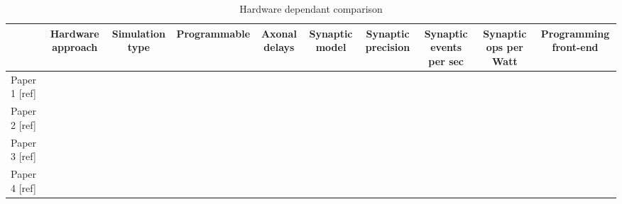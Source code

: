 \begin{table*}
  \caption{Hardware dependant comparison}
  \begin{center}
      \bgroup
      \def\arraystretch{1.4}
    \begin{tabular}{l | c c c c c c c c c}
      $ $ & 
       \begin{minipage}{1.2cm}\centering Hardware approach \end{minipage} & 
       \begin{minipage}{1.3cm}\centering Simulation type \end{minipage} & 
       \begin{minipage}{1.7cm}\centering Programmable \end{minipage} & 
       \begin{minipage}{1cm}\centering Axonal delays \end{minipage} & 
       \begin{minipage}{1cm}\centering Synaptic model \end{minipage} & 
       \begin{minipage}{1.2cm}\centering Synaptic precision \end{minipage} & 
       \begin{minipage}{1.2cm}\centering Synaptic events per sec \end{minipage} & 
       \begin{minipage}{1.4cm}\centering Synaptic ops per Watt \end{minipage} & 
       \begin{minipage}{1.7cm}\centering Programming front-end \end{minipage}  \\
       \hline
       \begin{minipage}{1.8cm}\centering Paper 1 [ref] \end{minipage} & & & & & & & & & \\
       \begin{minipage}{1.8cm}\centering Paper 2 [ref]\end{minipage} & & & & & & & & & \\
       \begin{minipage}{1.8cm}\centering Paper 3 [ref]\end{minipage} & & & & & & & & & \\
       \begin{minipage}{1.8cm}\centering Paper 4 [ref]\end{minipage} & & & & & & & & & 
    \end{tabular}
    \egroup
  \end{center}
  \label{tb:hardware_comparison}
\end{table*}
    
